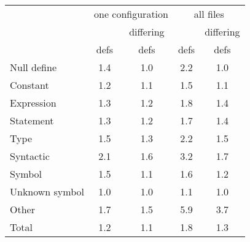 \begin{tabular}{|l|c|c|c|c|} \hline
 & \multicolumn{2}{c|}{one configuration}
 & \multicolumn{2}{c|}{all files} \\ \cline{2-5}
 & & \multicolumn{1}{c|}{differing} & & \multicolumn{1}{c|}{differing} \\
 & \multicolumn{1}{c|}{defs} & \multicolumn{1}{c|}{defs}
 & \multicolumn{1}{c|}{defs} & \multicolumn{1}{c|}{defs} \\ \hline
Null define &    1.4 & 1.0 & 2.2 & 1.0 \\
Constant &       1.2 & 1.1 & 1.5 & 1.1 \\
Expression &     1.3 & 1.2 & 1.8 & 1.4 \\
Statement &      1.3 & 1.2 & 1.7 & 1.4 \\
Type &           1.5 & 1.3 & 2.2 & 1.5 \\
Syntactic &      2.1 & 1.6 & 3.2 & 1.7 \\
Symbol &         1.5 & 1.1 & 1.6 & 1.2 \\
Unknown symbol & 1.0 & 1.0 & 1.1 & 1.0 \\
Other &          1.7 & 1.5 & 5.9 & 3.7 \\ \hline
Total &          1.2 & 1.1 & 1.8 & 1.3 \\ \hline
\end{tabular}


